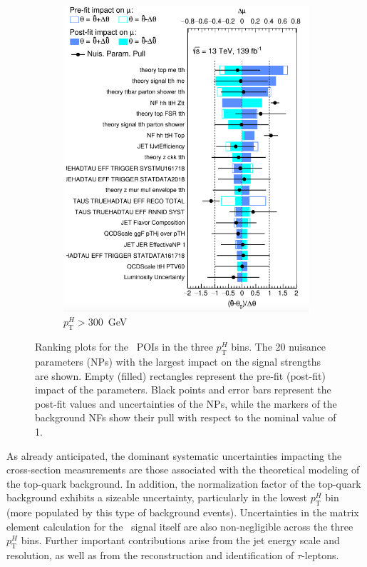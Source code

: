 \begin{figure}[htbp]
  \vspace{0.4cm}
  \begin{subfigure}[b]{0.45\textwidth}
    \centering
    \includegraphics[width=\linewidth]{images/fit_stxs/Ranking_r_11_ttH_ptH_gt300.png}
    \caption{\small $p_{\text{T}}^{H}>300$~GeV}
    \label{fig:ranking_tth_ptH_gt300}
  \end{subfigure}

  \caption{Ranking plots for the \ttH\ POIs in the three $p_{\text{T}}^{H}$ bins.
  The 20 nuisance parameters (NPs) with the largest impact on the signal strengths are shown. 
  Empty (filled) rectangles represent the pre-fit (post-fit) impact of the parameters. 
  Black points and error bars represent the post-fit values and uncertainties of the NPs, 
  while the markers of the background NFs show their pull with respect to the nominal value of 1.}
  \label{fig:ranking_tth_bins}
\end{figure}

As already anticipated, the dominant systematic uncertainties impacting the cross-section measurements are those associated with the theoretical modeling of the top-quark background. 
In addition, the normalization factor of the top-quark background exhibits a sizeable uncertainty, particularly in the lowest $p_{\text{T}}^{H}$ bin (more populated by this type of background events). 
Uncertainties in the matrix element calculation for the \ttH\ signal itself are also non-negligible across the three $p_{\text{T}}^{H}$ bins. 
Further important contributions arise from the jet energy scale and resolution, as well as from the reconstruction and identification of $\tau$-leptons.
